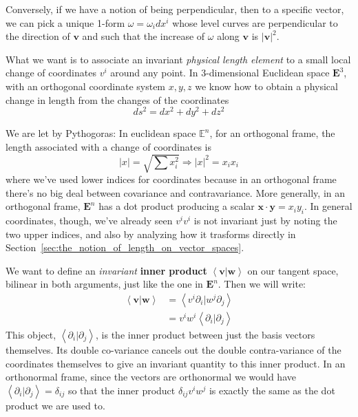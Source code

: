 	Conversely, if we have a notion of being perpendicular, then to a specific vector, we can pick a unique 1-form $\omega = \omega_i dx^i$ whose level curves are perpendicular to the direction of $\mathbf v$ and such that the increase of $\omega$ along $\mathbf v$ is $|\mathbf v|^2$.
	
	What we want is to associate an invariant \emph{physical length element} to a small local change of coordinates $v^i$ around any point. In 3-dimensional Euclidean space $\mathbf E^3$, with an orthogonal coordinate system $x,y,z$ we know how to obtain a physical change in length from the changes of the coordinates
	\begin{equation}
		ds^2 = dx^2 + dy^2 + dz^2
	\end{equation}
	
	
	
	We are let by Pythogoras: In euclidean space $\mathbb E^n$, for an orthogonal frame, the length associated with a change of coordinates is 
	\begin{equation}
		|x| = \sqrt{\sum x_i^2} \Rightarrow |x|^2 = x_i x_i
	\end{equation}
	where we've used lower indices for coordinates because in an orthogonal frame there's no big deal between covariance and contravariance. More generally, in an orthogonal frame, $\mathbf E^n$ has a dot product producing a scalar $\mathbf x \cdot \mathbf y = x_i y_i$. 
	In general coordinates, though, we've already seen $v^i v^i$ is not invariant just by noting the two upper indices, and also by analyzing how it trasforms directly in Section~\ref{sec:the_notion_of_length_on_vector_spaces}. 
	
	We want to define an \emph{invariant} \textbf{inner product} $\left< \mathbf v | \mathbf w \right>$ on our tangent space, bilinear in both arguments, just like the one in $\mathbf E^n$. Then we will write:
	\begin{equation}
		\begin{aligned}
			\left< \mathbf v | \mathbf w \right> &= \left< v^i \partial_i | w^j \partial_j \right> \\
			&= v^i w^i \left< \partial_i | \partial_j \right>
		\end{aligned}
	\end{equation}
	This object, $\left< \partial_i | \partial_j \right>$, is the inner product between just the basis vectors themselves. Its double co-variance cancels out the double contra-variance of the coordinates themselves to give an invariant quantity to this inner product. In an orthonormal frame, since the vectors are orthonormal we would have $\left< \partial_i | \partial_j \right> = \delta_{ij}$ so that the inner product $\delta_{ij} v^i w^j$ is exactly the same as the dot product we are used to. 
	
